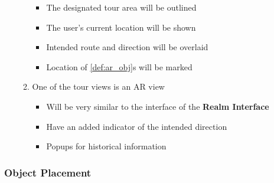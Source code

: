 \documentclass{article}
\begin{document}
\begin{enumerate}[align=left, label=\textbf{TR-FR\arabic*:}]
\begin{enumerate}[align=left, label=\textbf{TR-FR4.\arabic*:}]
\begin{itemize}
                        \item The designated tour area will be outlined
                        \item The user’s current location will be shown
                        \item Intended route and direction will be overlaid
                        \item Location of \ref{def:ar_obj}s will be marked
                    \end{itemize}
              \item One of the tour views is an AR view
                    \begin{itemize}
                        \item Will be very similar to the interface of the \textbf{Realm Interface}
                        \item Have an added indicator of the intended direction
                        \item Popups for historical information
                    \end{itemize}
          \end{enumerate}
\end{enumerate}

\subsubsection{Object Placement}
\label{ssub:object_placement}
\end{document}
